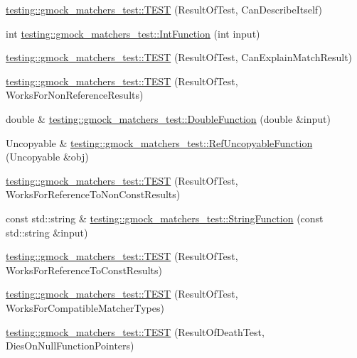 \begin{DoxyCompactItemize}
\item 
\mbox{\hyperlink{namespacetesting_1_1gmock__matchers__test_a1b5240d2272b679d7e3035554c2c5688}{testing\+::gmock\+\_\+matchers\+\_\+test\+::\+T\+E\+ST}} (Result\+Of\+Test, Can\+Describe\+Itself)
\item 
int \mbox{\hyperlink{namespacetesting_1_1gmock__matchers__test_a6e957b9dcda1186c6274a8895d1514b5}{testing\+::gmock\+\_\+matchers\+\_\+test\+::\+Int\+Function}} (int input)
\item 
\mbox{\hyperlink{namespacetesting_1_1gmock__matchers__test_ab7fe283b2955ca8bb11b2984a08eef33}{testing\+::gmock\+\_\+matchers\+\_\+test\+::\+T\+E\+ST}} (Result\+Of\+Test, Can\+Explain\+Match\+Result)
\item 
\mbox{\hyperlink{namespacetesting_1_1gmock__matchers__test_a86f01e29ee48050d401fceca21d1041e}{testing\+::gmock\+\_\+matchers\+\_\+test\+::\+T\+E\+ST}} (Result\+Of\+Test, Works\+For\+Non\+Reference\+Results)
\item 
double \& \mbox{\hyperlink{namespacetesting_1_1gmock__matchers__test_a48350ba4c1ce65694ec07e9c1c49a452}{testing\+::gmock\+\_\+matchers\+\_\+test\+::\+Double\+Function}} (double \&input)
\item 
Uncopyable \& \mbox{\hyperlink{namespacetesting_1_1gmock__matchers__test_aa6f7dd285163d5880cfd6685bec8cab4}{testing\+::gmock\+\_\+matchers\+\_\+test\+::\+Ref\+Uncopyable\+Function}} (Uncopyable \&obj)
\item 
\mbox{\hyperlink{namespacetesting_1_1gmock__matchers__test_a505e866c4066d27854cb6754c66a3eec}{testing\+::gmock\+\_\+matchers\+\_\+test\+::\+T\+E\+ST}} (Result\+Of\+Test, Works\+For\+Reference\+To\+Non\+Const\+Results)
\item 
const std\+::string \& \mbox{\hyperlink{namespacetesting_1_1gmock__matchers__test_abe0b3ba3be22e6b973ac6aa226ae85f3}{testing\+::gmock\+\_\+matchers\+\_\+test\+::\+String\+Function}} (const std\+::string \&input)
\item 
\mbox{\hyperlink{namespacetesting_1_1gmock__matchers__test_a17b952cce22be6338fb1369f886d61c4}{testing\+::gmock\+\_\+matchers\+\_\+test\+::\+T\+E\+ST}} (Result\+Of\+Test, Works\+For\+Reference\+To\+Const\+Results)
\item 
\mbox{\hyperlink{namespacetesting_1_1gmock__matchers__test_a1aceb307c843f0f5532053e390a7c654}{testing\+::gmock\+\_\+matchers\+\_\+test\+::\+T\+E\+ST}} (Result\+Of\+Test, Works\+For\+Compatible\+Matcher\+Types)
\item 
\mbox{\hyperlink{namespacetesting_1_1gmock__matchers__test_a4c929e5b46a503a9bb48c8b88dcbbf2a}{testing\+::gmock\+\_\+matchers\+\_\+test\+::\+T\+E\+ST}} (Result\+Of\+Death\+Test, Dies\+On\+Null\+Function\+Pointers)

\end{DoxyCompactItemize}
